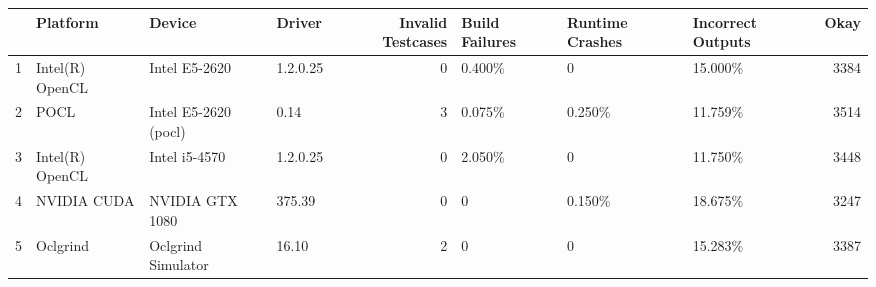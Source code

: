 \begin{tabular}{llllrlllr}
\toprule
{} &         Platform &                Device &    Driver &  Invalid Testcases & Build Failures & Runtime Crashes & Incorrect Outputs &  Okay \\
\midrule
1 &  Intel(R) OpenCL &         Intel E5-2620 &  1.2.0.25 &                  0 &         0.400\% &               0 &           15.000\% &  3384 \\
2 &             POCL &  Intel E5-2620 (pocl) &      0.14 &                  3 &         0.075\% &          0.250\% &           11.759\% &  3514 \\
3 &  Intel(R) OpenCL &         Intel i5-4570 &  1.2.0.25 &                  0 &         2.050\% &               0 &           11.750\% &  3448 \\
4 &      NVIDIA CUDA &       NVIDIA GTX 1080 &    375.39 &                  0 &              0 &          0.150\% &           18.675\% &  3247 \\
5 &         Oclgrind &    Oclgrind Simulator &     16.10 &                  2 &              0 &               0 &           15.283\% &  3387 \\
\bottomrule
\end{tabular}
